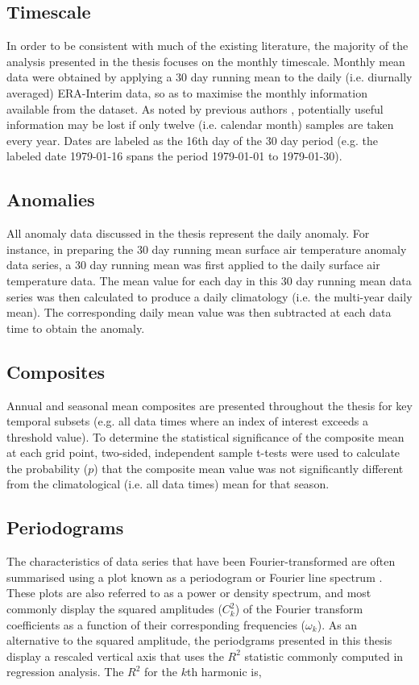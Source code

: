
\subsection{Timescale}
In order to be consistent with much of the existing literature, the majority of the analysis presented in the thesis focuses on the monthly timescale. Monthly mean data were obtained by applying a 30 day running mean to the daily (i.e. diurnally averaged) ERA-Interim data, so as to maximise the monthly information available from the dataset. As noted by previous authors \citep[e.g.][]{Kidson1988}, potentially useful information may be lost if only twelve (i.e. calendar month) samples are taken every year. Dates are labeled as the 16th day of the 30 day period (e.g. the labeled date 1979-01-16 spans the period 1979-01-01 to 1979-01-30). 

\subsection{Anomalies}
All anomaly data discussed in the thesis represent the daily anomaly. For instance, in preparing the 30 day running mean surface air temperature anomaly data series, a 30 day running mean was first applied to the daily surface air temperature data. The mean value for each day in this 30 day running mean data series was then calculated to produce a daily climatology (i.e. the multi-year daily mean). The corresponding daily mean value was then subtracted at each data time to obtain the anomaly.  

\subsection{Composites}
Annual and seasonal mean composites are presented throughout the thesis for key temporal subsets (e.g. all data times where an index of interest exceeds a threshold value). To determine the statistical significance of the composite mean at each grid point, two-sided, independent sample t-tests were used to calculate the probability ($p$) that the composite mean value was not significantly different from the climatological (i.e. all data times) mean for that season.

\subsection{Periodograms}
The characteristics of data series that have been Fourier-transformed are often summarised using a plot known as a periodogram or Fourier line spectrum \citep{Wilks2011}. These plots are also referred to as a power or density spectrum, and most commonly display the squared amplitudes ($C_k^2$) of the Fourier transform coefficients as a function of their corresponding frequencies ($\omega_k$). As an alternative to the squared amplitude, the periodgrams presented in this thesis display a rescaled vertical axis that uses the $R^2$ statistic commonly computed in regression analysis. The $R^2$ for the $k$th harmonic is,

